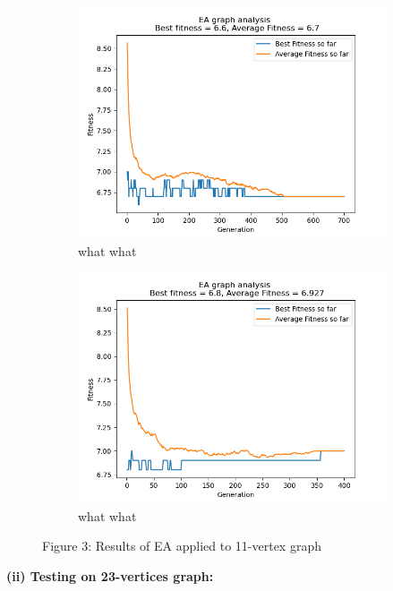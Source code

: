\documentclass[conference,compsoc]{IEEEtran}
\begin{document}
\begin{figure}[htb]\ContinuedFloat
  \centering
  \begin{subfigure}{0.34\textwidth}
    \includegraphics[width=\linewidth]{../Results/_11_RBS_Truncation_100_50_700.png}
      \caption{what what}
  \end{subfigure}
\begin{subfigure}{0.34\textwidth}
  \includegraphics[width=\linewidth]{../Results/_11_Truncation_Truncation_100_50_400.png}
    \caption{what what}
\end{subfigure}
\caption*{Figure 3: Results of EA applied to 11-vertex graph}
\label{fgigy}
\end{figure}
\newpage
\begin{center}
  \textbf{(ii) Testing on 23-vertices graph:}
\end{center}
\end{document}
